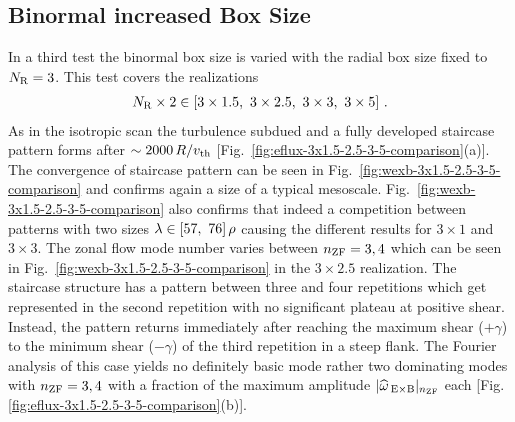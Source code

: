 
\newpage
\subsection{Binormal increased Box Size}
\label{sub:binormal}

In a third test the binormal box size is varied with the radial box size fixed to $N_\mathrm{R} = 3$.
This test covers the realizations
\begin{gather*}
	N_\mathrm{R} \times 2 \in [3\times1.5,~3\times2.5,~3\times3,~3\times5]~.
\end{gather*}
As in the isotropic scan the turbulence subdued and a fully developed staircase pattern forms after $\sim 2000\,R/v_{\mathrm{th}}$ [Fig.~\ref{fig:eflux-3x1.5-2.5-3-5-comparison}(a)]. The convergence of staircase pattern can be seen in Fig.~\ref{fig:wexb-3x1.5-2.5-3-5-comparison} and confirms again a size of a typical mesoscale. Fig.~\ref{fig:wexb-3x1.5-2.5-3-5-comparison} also confirms that indeed a competition between patterns with two sizes $\lambda \in [57,~ 76]\,\rho$ causing the different results for $3 \times 1$ and $3\times 3$. The zonal flow mode number varies between $n_\mathrm{ZF} = 3,4$ which can be seen in Fig.~\ref{fig:wexb-3x1.5-2.5-3-5-comparison} in the $3\times 2.5$ realization. The staircase structure has a pattern between three and four repetitions which get represented in the second repetition with no significant plateau at positive shear. Instead, the pattern returns immediately after reaching the maximum shear ($+ \gamma$) to the minimum shear ($- \gamma$) of the third repetition in a steep flank. The Fourier analysis of this case yields no definitely basic mode rather two dominating modes with $n_\mathrm{ZF} = 3, 4$ with a fraction of the maximum amplitude $|\widehat{\omega}_{\mathrm{\:E \times B}}|_{n_\mathrm{ZF}}$ each [Fig. \ref{fig:eflux-3x1.5-2.5-3-5-comparison}(b)].
\bigskip

